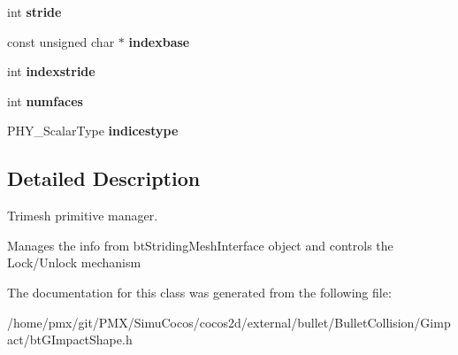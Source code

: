 \begin{DoxyCompactItemize}
\item 
\mbox{\label{classbtGImpactMeshShapePart_1_1TrimeshPrimitiveManager_aac08e1d058c883c2d55743b49fcfc22a}} 
int {\bfseries stride}
\item 
\mbox{\label{classbtGImpactMeshShapePart_1_1TrimeshPrimitiveManager_a31333827ca41c174e0433c50e61f4a5a}} 
const unsigned char $\ast$ {\bfseries indexbase}
\item 
\mbox{\label{classbtGImpactMeshShapePart_1_1TrimeshPrimitiveManager_a89579bcad54eab7c6f0a2a2c333bbb86}} 
int {\bfseries indexstride}
\item 
\mbox{\label{classbtGImpactMeshShapePart_1_1TrimeshPrimitiveManager_a11cbf1f22ec8f970e5c6eb8da6467c70}} 
int {\bfseries numfaces}
\item 
\mbox{\label{classbtGImpactMeshShapePart_1_1TrimeshPrimitiveManager_a8ac8d4c60009c6bb9f81c93b6f9d43f0}} 
P\+H\+Y\+\_\+\+Scalar\+Type {\bfseries indicestype}
\end{DoxyCompactItemize}


\subsection{Detailed Description}
Trimesh primitive manager. 

Manages the info from bt\+Striding\+Mesh\+Interface object and controls the Lock/\+Unlock mechanism 

The documentation for this class was generated from the following file\+:\begin{DoxyCompactItemize}
\item 
/home/pmx/git/\+P\+M\+X/\+Simu\+Cocos/cocos2d/external/bullet/\+Bullet\+Collision/\+Gimpact/bt\+G\+Impact\+Shape.\+h\end{DoxyCompactItemize}
